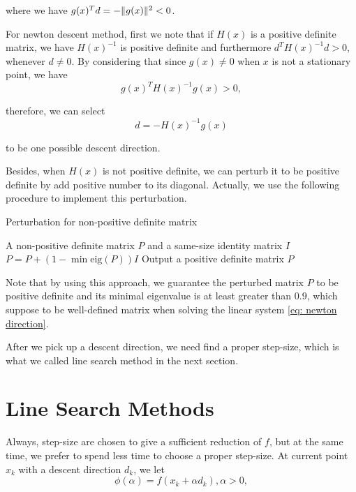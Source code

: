 \documentclass[11pt]{report}
\begin{document}
where we have $g(x)^Td = -\|g(x)\|^2 <0$.

For newton descent method, first we note that if $H(x)$ is a positive definite matrix, we have $H(x)^{-1}$ is positive definite and furthermore $d^TH(x)^{-1}d >0$, whenever $d\neq 0$. By considering that since $g(x)\neq 0$ when $x$ is not a stationary point, we have 
\begin{equation}
    g(x)^TH(x)^{-1}g(x) >0,
\end{equation}

therefore, we can select 
\begin{equation}\label{eq: newton direction}
    d = -H(x)^{-1}g(x) 
\end{equation}

to be one possible descent direction. 

Besides, when $H(x)$ is not positive definite, we can perturb it to be positive definite by add positive number to its diagonal. Actually, we use the following procedure to implement this perturbation.
\begin{algorithm}[H]
\caption{Perturbation for non-positive definite matrix}
\label{alg:Perturbation for non-positive definite matrix}
\begin{algorithmic}[1]
\REQUIRE A non-positive definite matrix $P$ and a same-size identity matrix $I$
    \STATE $P = P + (1-\min\mbox{eig}(P)) I$
\ENDIF
\STATE Output a positive definite matrix $P$
\end{algorithmic}
\end{algorithm}

Note that by using this approach, we guarantee the perturbed matrix $P$ to be positive definite and its minimal eigenvalue is at least greater than $0.9$, which suppose to be well-defined matrix when solving the linear system \eqref{eq: newton direction}.

After we pick up a descent direction, we need find a proper step-size, which is what we called line search method in the next section.

\section{Line Search Methods}\label{sec:Line_search}

Always, step-size are chosen to give a sufficient reduction of $f$, but at the same time, we prefer to spend less time to choose a proper step-size. At current point $x_k$ with a descent direction $d_k$, we let
\begin{equation}
    \phi(\alpha) = f(x_k + \alpha d_k), \alpha>0, 
\end{equation}
\end{document}
